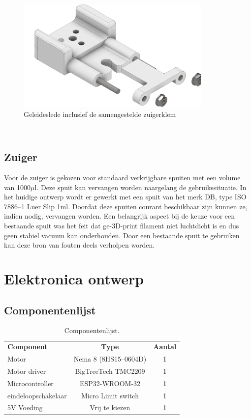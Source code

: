 \begin{minipage}[t]{0.59\textwidth}
    \vspace{0pt}
    \begin{figure}[H]
        \centering
        \includegraphics[width=0.85\textwidth]{figures/CarriageAndClamp.png}
        \caption{Geleideslede inclusief de samengestelde zuigerklem}\label{fig:CarriageAndClamp}
    \end{figure}
\end{minipage}\\

\subsection{Zuiger}
Voor de zuiger is gekozen voor standaard verkrijgbare spuiten met een volume van 1000$\mu$l. Deze spuit kan vervangen worden naargelang de gebruikssituatie. In het huidige ontwerp wordt er gewerkt met een spuit van het merk DB, type ISO 7886--1 Luer Slip 1ml. Doordat deze spuiten courant beschikbaar zijn kunnen ze, indien nodig, vervangen worden.
Een belangrijk aspect bij de keuze voor een bestaande spuit was het feit dat ge-3D-print filament niet luchtdicht is en dus geen stabiel vacuum kan onderhouden. Door een bestaande spuit te gebruiken kan deze bron van fouten deels verholpen worden.

\section{Elektronica ontwerp}
\subsection{Componentenlijst}
\begin{table}[H]
    \begin{tabular}{l|c|c}
        \textbf{Component} & \textbf{Type} & \textbf{Aantal} \\
        Motor & Nema 8 (8HS15--0604D)& 1 \\
        Motor driver & BigTreeTech TMC2209 & 1 \\
        Microcontroller & ESP32-WROOM-32 & 1 \\
        eindeloopschakelaar & Micro Limit switch & 1 \\
        5V Voeding & Vrij te kiezen\footnotemark & 1 \\
        \hline
    \end{tabular}
    \caption{Componentenlijst.}\label{tab:componentenlijst}
\end{table}
